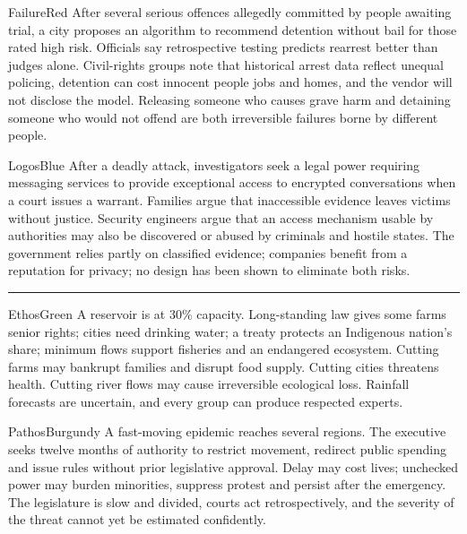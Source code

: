 \documentclass[a4paper,nofonts,sfsidenotes]{tufte-handout}
\newcommand{\rhetoricsection}[3]{%
  \Needspace{7\baselineskip}
  \par\addvspace{0.8\baselineskip}
  \begin{fullwidth}
    {\color{#3}\rule{\linewidth}{0.85pt}}\par
    \vspace{0.2\baselineskip}
    {\sffamily\bfseries\large\color{#3}\textls[75]{\MakeUppercase{#1}}}%
    \hspace{0.75em}{\large\itshape\color{Ink}#2}
  \end{fullwidth}
  \vspace{0.1\baselineskip}
}
\begin{document}
\begin{casebox}{FailureRed}
After several serious offences allegedly committed by people awaiting trial, a
city proposes an algorithm to recommend detention without bail for those rated
high risk. Officials say retrospective testing predicts rearrest better than
judges alone. Civil-rights groups note that historical arrest data reflect
unequal policing, detention can cost innocent people jobs and homes, and the
vendor will not disclose the model. Releasing someone who causes grave harm and
detaining someone who would not offend are both irreversible failures borne by
different people.
\end{casebox}

\begin{casebox}{LogosBlue}
After a deadly attack, investigators seek a legal power requiring messaging
services to provide exceptional access to encrypted conversations when a court
issues a warrant. Families argue that inaccessible evidence leaves victims
without justice. Security engineers argue that an access mechanism usable by
authorities may also be discovered or abused by criminals and hostile states.
The government relies partly on classified evidence; companies benefit from a
reputation for privacy; no design has been shown to eliminate both risks.
\end{casebox}

\newpage
\rhetoricsection{Practice continued}{Institutional dilemmas}{Ink}

\begin{casebox}{EthosGreen}
A reservoir is at 30\% capacity. Long-standing law gives some farms senior
rights; cities need drinking water; a treaty protects an Indigenous nation's
share; minimum flows support fisheries and an endangered ecosystem. Cutting
farms may bankrupt families and disrupt food supply. Cutting cities threatens
health. Cutting river flows may cause irreversible ecological loss. Rainfall
forecasts are uncertain, and every group can produce respected experts.
\end{casebox}

\begin{casebox}{PathosBurgundy}
A fast-moving epidemic reaches several regions. The executive seeks twelve
months of authority to restrict movement, redirect public spending and issue
rules without prior legislative approval. Delay may cost lives; unchecked
power may burden minorities, suppress protest and persist after the emergency.
The legislature is slow and divided, courts act retrospectively, and the
severity of the threat cannot yet be estimated confidently.
\end{casebox}
\end{document}
